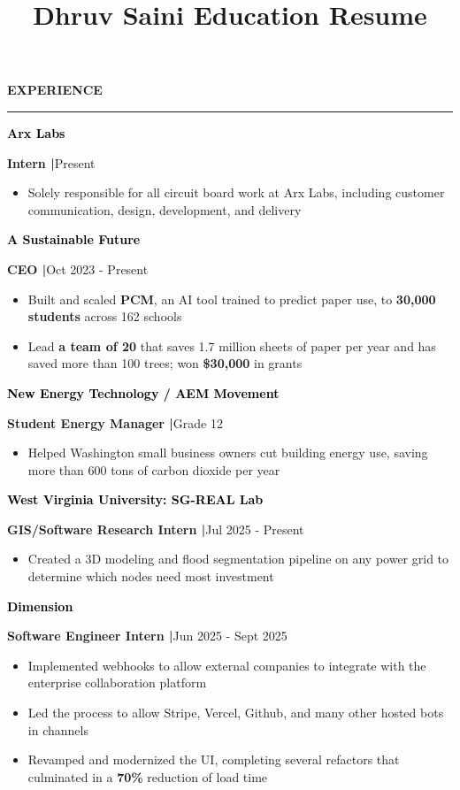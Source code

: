 \documentclass[8pt,a4paper]{altacv}
\title{Dhruv Saini Education Resume}
\makeatletter
\newcommand{\resumebodysize}{\fontsize{8pt}{9pt}\selectfont}
\renewcommand{\divider}{\textcolor{body!30}{\hdashrule{\linewidth}{0.6pt}{0.285em}}\vspace{2.5pt}}
\newcommand{\projectdivider}{\vskip-1.937pt\divider}
\renewcommand{\makecvheader}{%
  \begingroup
    \raggedright\color{emphasis}%
    {\Huge\bfseries\MakeUppercase{\@name}\par}
    \vspace{4.3pt}
    {\small\bfseries\@personalinfo\par}
  \endgroup
}
\renewcommand{\cvsection}[2][]{%
  \bigskip%
  \vspace{3.686pt}%
  \ifstrequal{#1}{}{}{\marginpar{\vspace*{\dimexpr1pt-\baselineskip}\raggedright}}%
  {\color{heading}\large\bfseries\MakeUppercase{#2}}\\[-1ex]\vspace{1.489pt}%
  {\color{heading}\rule{\linewidth}{2pt}\par}\medskip\vspace{1.179pt}
}
\renewcommand{\cvevent}[4]{%
  {\fontsize{9pt}{9pt}\selectfont\color{black}\hspace*{-0.282pt}#1\par}
  \ifstrequal{#2}{}{}{%
    \vspace{2.144pt}
    {\fontsize{9pt}{9pt}\selectfont\textbf{\color{accent}#2}\hspace{0.5em}\resumebodysize\faCalendar\hspace{0.5em}#3\par}%
  }%
  \vspace{2.145pt}\resumebodysize
}
\makeatother
\begin{document}
\makecvheader
\vskip0.917pt
\resumebodysize

\cvsection{Experience}
\vskip0.464pt

\cvevent{\textcolor{black}{\textbf{Arx Labs}}}{\textnormal{Intern |}}{Present}{}
\begin{itemize}
\item Solely responsible for all circuit board work at Arx Labs, including customer communication, design, development, and delivery
\end{itemize}
\divider

\cvevent{\textcolor{black}{\textbf{A Sustainable Future}}}{\textnormal{CEO |}}{Oct 2023 - Present}{}
\begin{itemize}
\item Built and scaled \textbf{PCM}, an AI tool trained to predict paper use, to \textbf{30,000 students} across 162 schools
\item Lead \textbf{a team of 20} that saves 1.7 million sheets of paper per year and has saved more than 100 trees; won \textbf{\$30,000} in grants
\end{itemize}
\projectdivider

\cvevent{\textcolor{black}{\textbf{New Energy Technology / AEM Movement}}}{\textnormal{Student Energy Manager |}}{Grade 12}{}
\begin{itemize}
\item Helped Washington small business owners cut building energy use, saving more than 600 tons of carbon dioxide per year
\end{itemize}
\projectdivider

\cvevent{\textcolor{black}{\textbf{West Virginia University: SG-REAL Lab}}}{\textnormal{GIS/Software Research Intern |}}{Jul 2025 - Present}{}
\begin{itemize}
\item Created a 3D modeling and flood segmentation pipeline on any power grid to determine which nodes need most investment
\end{itemize}
\divider

\cvevent{\textcolor{black}{\textbf{Dimension}}}{\textnormal{Software Engineer Intern |}}{Jun 2025 - Sept 2025}{}
\begin{itemize}
\item Implemented webhooks to allow external companies to integrate with the enterprise collaboration platform
\item Led the process to allow Stripe, Vercel, Github, and many other hosted bots in channels
\item Revamped and modernized the UI, completing several refactors that culminated in a \textbf{70\%} reduction of load time
\end{itemize}
\divider
\end{document}
